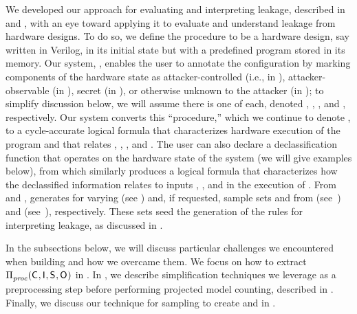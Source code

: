 We developed our approach for evaluating and interpreting leakage,
described in  and , with an eye toward
applying it to evaluate and understand leakage from hardware designs.
To do so, we define the procedure \proc to be a hardware design, say
written in Verilog, in its initial state but with a predefined program
stored in its memory.  Our system, \thirdsysname, enables the user to
annotate the configuration by marking components of the hardware state
as attacker-controlled (i.e., in \ACIKeys), attacker-observable (in
\AOOKeys), secret (in \SecKeys), or otherwise unknown to the attacker
(in \AIIKeys); to simplify discussion below, we will assume there is
one of each, denoted \ACIVar, \AOOVar, \SecVar, and \AIIVar,
respectively.  Our system converts this ``procedure,'' which we
continue to denote \proc, to a cycle-accurate logical formula
\postcondition{\proc}{} that characterizes hardware execution of the
program and that relates \ACIFn{}, \AOOFn{}, \AIIFn{}, and \SecFn{}.
The user can also declare a declassification function \declassify{}
that operates on the hardware state of the system (we will give
examples below), from which \thirdsysname similarly produces a logical
formula \postcondition{\declassify{}}{} that characterizes how the
declassified information \DCFn{} relates to inputs \ACIFn{}, \AIIFn{},
and \SecFn{} in the execution of \proc. From \postcondition{\proc}{}
and \postcondition{\declassify{}}{}, \thirdsysname generates
\JaccardWithDeclass{\secretsSetSize} for varying \secretsSetSize (see
) and, if requested, sample sets
\interferenceSetSamples and \noninterferenceSetSamples from
\interferenceSet (see~) and
\noninterferenceSet(see~), respectively.
These sets seed the generation of the rules for interpreting leakage,
as discussed in .

In the subsections below, we will discuss particular challenges we
encountered when building \thirdsysname and how we overcame them. We
focus on how to extract $\Pi_{\mathit{proc}}^{}(\mathsf{C}_{},
\mathsf{I}_{}, \mathsf{S}_{}, \mathsf{O}_{})$ in .  In
, we describe simplification techniques we
leverage as a preprocessing step before performing projected model
counting, described in .  Finally, we discuss
our technique for sampling to create \interferenceSetSamples and
\noninterferenceSetSamples in .


